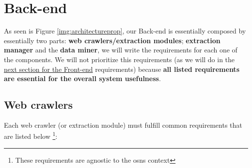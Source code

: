 \section{Back-end}

As seen is Figure \ref{img:architectureprop}, our Back-end is essentially composed by essentially two parts: \textbf{web crawlers/extraction modules}; \textbf{extraction manager} and the \textbf{data miner}, we will write the requirements for each one of the components. We will not prioritize this requirements (as we will do in the \hyperref[sec:frontend]{next section for the Front-end} requirements) because \textbf{all listed requirements are essential for the overall system usefulness}.

\subsection{Web crawlers}

Each web crawler (or extraction module) must fulfill common requirements that are listed below \footnote{These requirements are agnostic to the \glspl{osn} context}:

